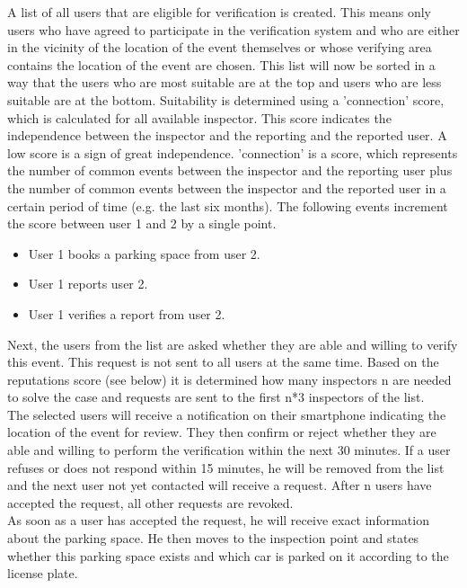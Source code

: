 \documentclass[
a4paper,     %
titlepage,   %
14pt         %
]{scrartcl}  %
\theoremstyle{mystyle}
\begin{document}
A list of all users that are eligible for verification is created. This means only users who have agreed to participate in the verification system and who are either in the vicinity of the location of the event themselves or whose verifying area contains the location of the event are chosen. This list will now be sorted in a way that the users who are most suitable are at the top and users who are less suitable are at the bottom. Suitability is determined using a 'connection' score, which is calculated for all available inspector. This score indicates the independence between the inspector and the reporting and the reported user. A low score is a sign of great independence. 'connection' is a score, which represents the number of common events between the inspector and the reporting user plus the number of common events between the inspector and the reported user in a certain period of time (e.g. the last six months). The following events increment the score between user 1 and 2 by a single point.
\begin{itemize}
\item User 1 books a parking space from user 2.
\item User 1 reports user 2.
\item User 1 verifies a report from user 2.
\end{itemize}

Next, the users from the list are asked whether they are able and willing to verify this event. This request is not sent to all users at the same time. Based on the reputations score (see below) it is determined how many inspectors n are needed to solve the case and requests are sent to the first n*3 inspectors of the list.\\

The selected users will receive a notification on their smartphone indicating the location of the event for review. They then confirm or reject whether they are able and willing to perform the verification within the next 30 minutes. If a user refuses or does not respond within 15 minutes, he will be removed from the list and the next user not yet contacted will receive a request. After n users have accepted the request, all other requests are revoked.\\

As soon as a user has accepted the request, he will receive exact information about the parking space. He then moves to the inspection point and states whether this parking space exists and which car is parked on it according to the license plate.\\
\end{document}
